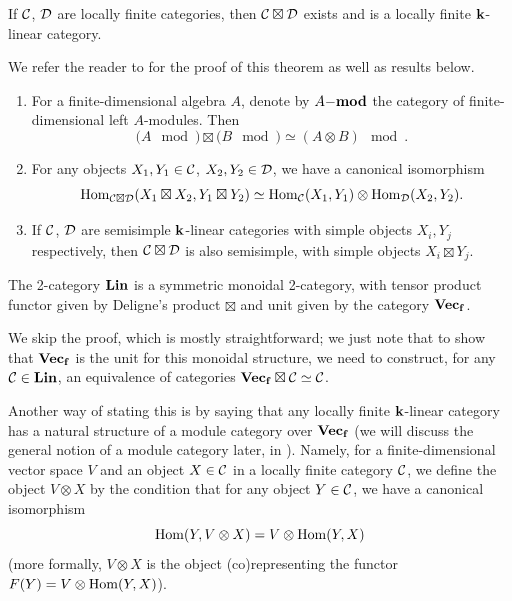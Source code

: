 \begin{theorem}\label{t:deligne-product}
  If $\calC$, $\calD$ are locally finite categories,
  then $\calC\boxtimes \calD$ exists
  and is a locally finite $\kk$-linear category.
\end{theorem}
We refer the reader to \cite[Section 1.11]{etingof-fusion} for the proof of
this theorem as well as results below.
\begin{lemma}\label{l:deligne-product-mod}
  \begin{enumerate}
  \item
    For a finite-dimensional algebra $A$, denote by $A\mod$ the category of
    finite-dimensional left $A$-modules. Then
    $$
      (A\mod)\boxtimes (B\mod) \simeq (A\otimes B)\mod.
    $$
  \item
    For any objects $X_1, Y_1\in \calC$, $X_2, Y_2\in \calD$, we have a
    canonical isomorphism
    $$
       \Hom_{\calC \boxtimes \calD} (X_1\boxtimes X_2, Y_1\boxtimes Y_2 )\simeq
         \Hom_{\calC} (X_1,  Y_1) \otimes
         \Hom_{\calD} (X_2, Y_2 ).
    $$
  \item If $\calC$, $\calD$ are semisimple $\kk$-linear categories with simple
    objects $X_i, Y_j$ respectively, then $\calC\boxtimes \calD$ is also
    semisimple, with simple objects $X_i\boxtimes Y_j$.
   \end{enumerate}
\end{lemma}

\begin{theorem}\label{t:linear-monoidal-2cat}
  The 2-category $\Linlf$ is a symmetric monoidal 2-category, with tensor
  product functor given by Deligne's product $\boxtimes$ and unit given by the
  category $\vecf$.
\end{theorem}
We skip the proof, which is mostly straightforward; we just note that to show
that $\vecf$ is the unit for this monoidal structure, we need to construct,
for any $\calC\in \Linlf$, an equivalence of categories $\vecf\boxtimes
\calC\simeq \calC$.

Another way of stating this is by saying that any locally finite $\kk$-linear
category has a natural structure of a module category over $\vecf$ (we will
discuss the general notion of a module category later, in
). Namely, for a
finite-dimensional vector space $V$ and an object $X\in \calC$ in a locally
finite category $\calC$, we define the object $V\otimes X$ by the condition that
for any object $Y\in \calC$, we have a canonical isomorphism
$$
  \Hom(Y, V\otimes X)=V\otimes \Hom(Y, X)
$$
(more formally, $V\otimes X$ is the object (co)representing the functor
$F(Y)=V\otimes \Hom(Y,X)$).

\clearpage
